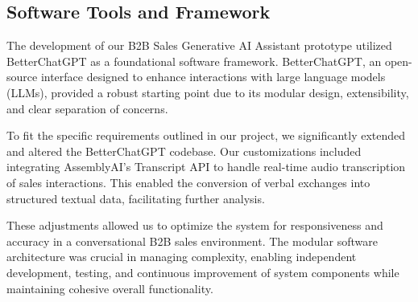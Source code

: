 \subsection{Software Tools and Framework}

The development of our B2B Sales Generative AI Assistant prototype utilized BetterChatGPT as a foundational software framework. BetterChatGPT, an open-source interface designed to enhance interactions with large language models (LLMs), provided a robust starting point due to its modular design, extensibility, and clear separation of concerns.

To fit the specific requirements outlined in our project, we significantly extended and altered the BetterChatGPT codebase. Our customizations included integrating AssemblyAI’s Transcript API to handle real-time audio transcription of sales interactions. This enabled the conversion of verbal exchanges into structured textual data, facilitating further analysis.

These adjustments allowed us to optimize the system for responsiveness and accuracy in a conversational B2B sales environment. The modular software architecture was crucial in managing complexity, enabling independent development, testing, and continuous improvement of system components while maintaining cohesive overall functionality.
